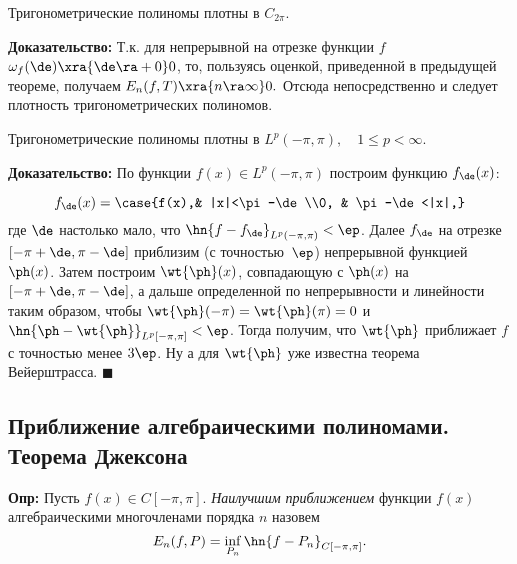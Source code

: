 \documentclass{article}
\begin{document}
\begin{theorem}[Вейерштрасс] Тригонометрические полиномы плотны в
$C_{2\pi}.$
\end{theorem}
\textbf{Доказательство:} Т.к. для непрерывной на отрезке функции
$f$ $\omega_f(\de)\xra{\de\ra +0} 0$, то,
пользуясь оценкой, приведенной в предыдущей теореме, получаем
$E_n(f,T)\xra{n\ra\infty} 0.$ Отсюда
непосредственно и следует плотность тригонометрических полиномов.

\begin{theorem} Тригонометрические полиномы плотны в
$L^p(-\pi,\pi),\quad1\le p<\infty$.
\end{theorem}
\textbf{Доказательство:} По функции $f(x)\in L^p(-\pi,\pi)$
построим функцию $f_{\de}(x)$:

\begin{wrapfigure}[8]{l}{140pt}
\end{wrapfigure}

$$f_{\de}(x)=
\case{f(x),& |x|<\pi-\de\\0, & \pi-\de<|x|,}$$
где $\de$ настолько мало, что
$\hn{f-f_{\de}}_{L^p(-\pi,\pi)}<\ep$. Далее $f_{\de}$
на отрезке $[-\pi+\de,\pi-\de]$ приблизим (с
точностью~$\ep$) непрерывной функцией $\ph(x)$. Затем
построим $\wt{\ph}(x)$, совпадающую с $\ph(x)$ на
$[-\pi+\de,\pi-\de]$, а дальше определенной по непрерывности
и линейности таким образом, чтобы
$\wt{\ph}(-\pi)=\wt{\ph}(\pi)=0$ и
$\hn{\ph-\wt{\ph}}_{L^p[-\pi,\pi]}<\ep$. Тогда
получим, что $\wt{\ph}$ приближает $f$ с точностью менее
$3\ep$. Ну а для $\wt{\ph}$ уже известна теорема
Вейерштрасса. $\blacksquare$

\subsection{Приближение алгебраическими полиномами. Теорема Джексона}
\textbf{Опр:} Пусть $f(x)\in C[-\pi,\pi]$. \emph{Наилучшим
приближением} функции $f(x)$ алгебраическими многочленами порядка
$n$ назовем
$$E_n(f,P)=\inf_{P_n}\hn{f-P_n}_{C[-\pi,\pi]}.$$
\end{document}

